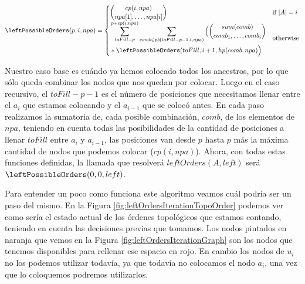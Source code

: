
 \[
    \leftPossibleOrders(p,i,npa) = 
    \begin{cases} 
    \begin{aligned}
        \binom{ cp(i, npa)}{npa[1], \ldots, npa[i]} 
    \end{aligned} & \text{if $|A|=i$} \\
    \begin{aligned}
    &\sum_{toFill=p}^{p+cp(i,npa)} \sum_{comb \in pb(toFill-p-1,i, npa)} \Big(\binom{ sum(comb)}{comb_1, \ldots, comb_i} \\
    &  * \leftPossibleOrders(toFill,i+1,hp(comb, npa)\Big)
    \end{aligned}
    & \text{otherwise}
    \end{cases}
\]


Nuestro caso base es cuándo ya hemos colocado todos los ancestros, por lo que sólo queda combinar los nodos que nos quedan por colocar. Luego en el caso recursivo, el $toFill-p-1$ es el número de posiciones que necesitamos llenar entre el $a_i$ que estamos colocando y el $a_{i-1}$ que se colocó antes. En cada paso realizamos la sumatoria de, cada posible combinación, $comb$, de los elementos de $npa$, teniendo en cuenta todas las posibilidades de la cantidad de posiciones a llenar $toFill$ entre $a_i$ y $a_{i-1}$, las posiciones van desde $p$ hasta $p$ más la máxima cantidad de nodos que podemos colocar ($cp(i,npa)$). 
Ahora, con todas estas funciones definidas, la llamada que resolverá $leftOrders(A, left)$ será $\leftPossibleOrders(0,0,left)$.

Para entender un poco como funciona este algoritmo veamos cuál podría ser un paso del mismo. En la Figura \ref{fig:leftOrdersIterationTopoOrder} podemos ver como sería el estado actual de los órdenes topológicos que estamos contando, teniendo en cuenta las decisiones previas que tomamos. Los nodos pintados en naranja que vemos en la Figura \ref{fig:leftOrdersIterationGraph} son los nodos que tenemos disponibles para rellenar ese espacio en rojo. En cambio los nodos de $u_i$ no los podemos utilizar todavía, ya que todavía no colocamos el nodo $a_i$, una vez que lo coloquemos podremos utilizarlos. 

